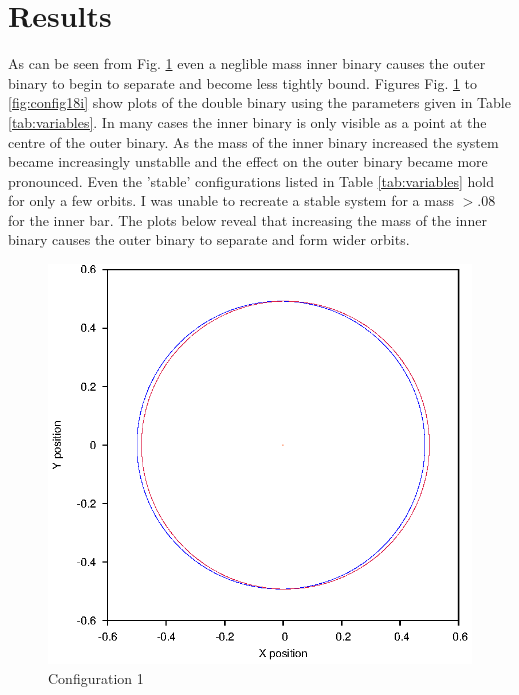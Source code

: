 \documentclass[a4paper,12pt]{article}
\begin{document}
\section{Results}
As can be seen from Fig. \ref{fig:config1} even a neglible mass inner binary causes the outer binary to begin to separate and become less tightly bound.
Figures Fig. \ref{fig:config1} to \ref{fig:config18i} show plots of the double binary using the parameters given in Table \ref{tab:variables}.
In many cases the inner binary is only visible as a point at the centre of the outer binary.
As the mass of the inner binary increased the system became increasingly unstablle and the effect on the outer binary became more pronounced.
Even the 'stable' configurations listed in Table \ref{tab:variables} hold for only a few orbits.
I was unable to recreate a stable system for a mass $>.08$ for the inner bar.
The plots below reveal that increasing the mass of the inner binary causes the outer binary to separate and
form wider orbits.
\begin{figure}[H]
\centering
\includegraphics[width=.9\textwidth]{./results/stablebase/Orbit.eps}
\caption{Configuration 1}
\label{fig:config1}
\end{figure}
\end{document}

